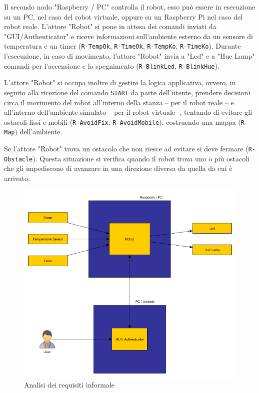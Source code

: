 \documentclass{llncs}
\newcommand{\action}[1]{\texttt{#1}\xspace}
\newcommand{\code}[1]{{\color{blue}\small{\texttt{#1}}}}
\begin{document}
Il secondo nodo "Raspberry / PC" controlla il robot, esso può essere in esecuzione su un PC, nel caso del robot virtuale, oppure su un Raspberry Pi nel caso del robot reale. L'attore "Robot" si pone in attesa dei comandi inviati da "GUI/Authenticator" e riceve informazioni sull'ambiente esterno da un sensore di temperatura e un timer (\code{R-TempOk}, \code{R-TimeOk}, \code{R-TempKo}, \code{R-TimeKo}). Durante l'esecuzione, in caso di movimento, l'attore "Robot" invia a "Led" e a "Hue Lamp" comandi per l'accensione e lo spegnimento (\code{R-BlinkLed}, \code{R-BlinkHue}). 

L'attore "Robot" si occupa inoltre di gestire la logica applicativa, ovvero, in seguito alla ricezione del comando \action{START} da parte dell'utente, prendere decisioni circa il movimento del robot all'interno della stanza – per il robot reale – e all'interno dell'ambiente simulato – per il robot virtuale -, tentando di evitare gli ostacoli fissi e mobili (\code{R-AvoidFix}, \code{R-AvoidMobile}), costruendo una mappa (\code{R-Map}) dell'ambiente.

Se l'attore "Robot" trova un ostacolo che non riesce ad evitare si deve fermare (\code{R-Obstacle}).
Questa situazione si verifica quando il robot trova uno o più ostacoli che gli impediscono di avanzare in una direzione diversa da quella da cui è arrivato.

\begin{figure}
\centering
\includegraphics[scale=0.4]{img/requirements_analysis.png}
\caption{Analisi dei requisiti informale}
\label{fig:reqAnalysis}
\end{figure}
\end{document}
